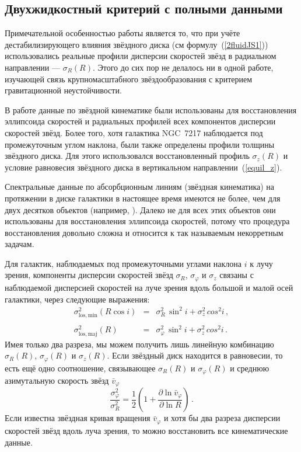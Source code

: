 \documentclass[russian,12pt]{article}
\begin{document}
\subsection{Двухжидкостный критерий с полными данными}

Примечательной особенностью работы \cite{Silchenko+11} является то, что 
при учёте дестабилизирующего влияния звёздного диска (см 
формулу~(\ref{2fluidJS1})) использовались реальные профили дисперсии 
скоростей звёзд в радиальном направлении --- $\sigma_R(R)$. Этого до 
сих пор не делалось ни в одной работе, изучающей связь 
крупномасштабного звёздообразования с критерием гравитационной 
неустойчивости.

В работе \cite{Silchenko+11} данные по звёздной кинематике были использованы 
для восстановления эллипсоида скоростей и радиальных профилей всех 
компонентов дисперсии скоростей звёзд. Более того, хотя галактика NGC~7217 
наблюдается под промежуточным углом наклона, были также определены профили 
толщины звёздного диска. Для этого использовался восстановленный профиль 
$\sigma_z(R)$ и условие равновесия звёздного диска в вертикальном 
направлении~(\ref{equil_z}).

Спектральные данные по абсорбционным линиям (звёздная кинематика) на 
протяжении в диске галактики в настоящее время имеются не более, чем 
для двух десятков объектов 
(например, 
\citealp{G+97,G+00,Sh+03,N+08,Zasov+08,Silchenko+11,GSh12,Zasov+12}).
Далеко не для всех этих объектов они использованы для восстановления 
эллипсоида скоростей, потому что процедура восстановления довольно сложна 
и относится к так называемым некорретным задачам.

Для галактик, наблюдаемых под промежуточными углами наклона $i$ к лучу 
зрения, компоненты дисперсии скоростей звёзд $\sigma_R$, $\sigma_{\varphi}$ 
и $\sigma_z$ связаны с наблюдаемой дисперсией скоростей на луче зрения вдоль 
большой и малой осей галактики, через следующие выражения:
\begin{equation}
\begin{array}{rcl}
\sigma_\mathrm{los,min}^2 (R \cos i) & = 
& \sigma_R^2 \, \sin^2 i + \sigma_z^2 \, cos^2 i \, ,\\
& &\\
\sigma_\mathrm{los,maj}^2 (R) & = 
& \sigma_\varphi^2 \, \sin^2 i + \sigma_z^2 \, cos^2 i \, .
\end{array}
\label{slos}
\end{equation}
Имея только два разреза, мы можем получить лишь линейную комбинацию  
$\sigma_R(R)$, $\sigma_\varphi(R)$ и $\sigma_z(R)$. Если звёздный диск 
находится в равновесии, то есть ещё одно соотношение, связывающее 
$\sigma_R(R)$ и $\sigma_\varphi(R)$ и среднюю азимутальную скорость 
звёзд $\bar{v}_\varphi$ \citep{BT87}
\begin{equation}
\frac{\sigma_\varphi^2}{\sigma_R^2} = \frac{1}{2} 
\left( 1 + \frac{\partial \ln \bar{v}_\varphi}{\partial \ln R}\right) 
\, .
\label{vphi}
\end{equation}
Если известна звёздная кривая вращения $\bar{v}_\varphi$ и хотя бы два 
разреза дисперсии скоростей звёзд вдоль луча зрения, то можно восстановить 
все кинематические данные.
\end{document}
